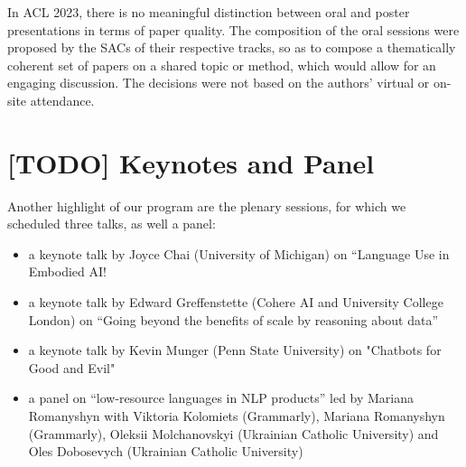 In ACL 2023, there is no meaningful distinction between oral and poster presentations in terms of paper quality. The composition of the oral sessions were proposed by the SACs of their respective tracks, so as to compose a thematically coherent set of papers on a shared topic or method, which would allow for an engaging discussion. The decisions were not based on the authors' virtual or on-site attendance.

\section*{[TODO] Keynotes and Panel}
Another highlight of our program are the plenary sessions, for which we scheduled three talks, as well a panel:
\begin{itemize}
\item a keynote talk by Joyce Chai (University of Michigan) on “Language Use in Embodied AI!
\item a keynote talk by Edward Greffenstette (Cohere AI and University College London) on “Going beyond the benefits of scale by reasoning about data”
\item a keynote talk by Kevin Munger (Penn State University) on "Chatbots for Good and Evil"
\item a panel on “low-resource languages in NLP products” led by Mariana Romanyshyn with Viktoria Kolomiets (Grammarly), Mariana Romanyshyn (Grammarly), Oleksii Molchanovskyi (Ukrainian Catholic University) and Oles Dobosevych (Ukrainian Catholic University)
\end{itemize}

